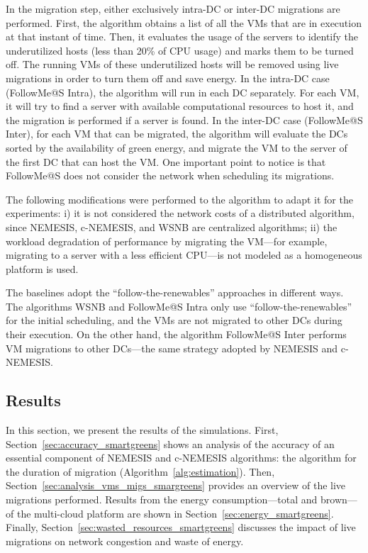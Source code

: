 In the migration step, either exclusively intra-DC or inter-DC migrations are performed. First, the algorithm obtains a list of all the VMs that are in execution at that instant of time. Then, it evaluates the usage of the servers to identify the underutilized hosts (less than 20\% of CPU usage) and marks them to be turned off. The running VMs of these underutilized hosts will be removed using live migrations in order to turn them off and save energy. In the intra-DC case (FollowMe@S Intra), the algorithm will run in each DC separately. For each VM, it will try to find a server with available computational resources to host it, and the migration is performed if a server is found. In the inter-DC case (FollowMe@S Inter), for each VM that can be migrated, the algorithm will evaluate the DCs sorted by the availability of green energy, and migrate the VM to the server of the first DC that can host the VM. One important point to notice is that FollowMe@S does not consider the network when scheduling its migrations. 

The following modifications were performed to the algorithm to adapt it for the experiments: i) it is not considered the network costs of a distributed algorithm, since NEMESIS, c-NEMESIS, and WSNB are centralized algorithms; ii) the workload degradation of performance by migrating the VM---for example, migrating to a server with a less efficient CPU---is not modeled as a homogeneous platform is used.

The baselines adopt the ``follow-the-renewables'' approaches in different ways. The algorithms WSNB and FollowMe@S Intra only use ``follow-the-renewables'' for the initial scheduling, and the VMs are not migrated to other DCs during their execution. On the other hand, the algorithm FollowMe@S Inter performs VM migrations to other DCs---the same strategy adopted by NEMESIS and c-NEMESIS.



\subsection{Results}

\label{sec:results_smargreens}

In this section, we present the results of the simulations. First, Section~\ref{sec:accuracy_smartgreens} shows an analysis of the accuracy of an essential component of NEMESIS and c-NEMESIS algorithms: the algorithm for the duration of migration (Algorithm~\ref{alg:estimation}). Then, Section~\ref{sec:analysis_vms_migs_smargreens} provides an overview of the live migrations performed. Results from the energy consumption---total and brown---of the multi-cloud platform are shown in Section~\ref{sec:energy_smartgreens}. Finally, Section~\ref{sec:wasted_resources_smartgreens} discusses the impact of live migrations on network congestion and waste of energy.

